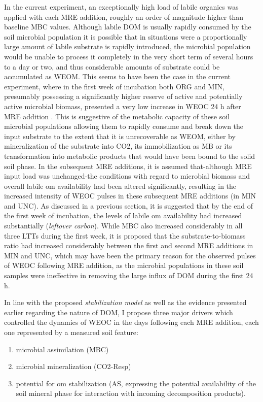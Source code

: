 	In the current experiment, an exceptionally high load of labile organics was applied with each MRE addition, roughly an order of magnitude higher than baseline MBC values.  Although labile DOM is usually rapidly consumed by the soil microbial population\myRed{*} it is possible that in situations were a proportionally large amount of labile substrate is rapidly introduced, the microbial population would be unable to process it completely\myRed{*} in the very short term of several hours to a day or two, and thus considerable amounts of substrate could be accumulated as WEOM. This seems to have been the case in the current experiment, where in the first week of incubation both ORG and MIN, presumably possessing a significantly higher reserve of active and potentially active microbial biomass, presented a very low increase in WEOC 24 h after MRE addition . This is suggestive of the metabolic capacity of these soil microbial populations allowing them to rapidly consume and break down the input substrate to the extent that it is unrecoverable as WEOM, either by mineralization of the substrate into CO2, its immobilization as MB or its transformation into metabolic products that would have been bound to the solid soil phase.
	 In the subsequent MRE additions, it is assumed that-although MRE input load was unchanged-the conditions with regard to microbial biomass and overall labile \gls{om} availability had been altered significantly, resulting in the increased intensity of WEOC pulses in these subsequent MRE additions (in MIN and UNC). As discussed in a previous section, it is suggested that by the end of the first week of incubation, the levels of labile \gls{om} availability had increased substantially (\textit{leftover carbon}). While MBC also increased  considerably in all three LTTs during the first week, it is proposed that the substrate-to-biomass  ratio had increased considerably between the first and second MRE additions in MIN and UNC, which may have been the primary reason for the observed pulses of WEOC following MRE addition, as the microbial populations in these soil samples were ineffective in removing the large influx of DOM during the first 24 h.

	In line with the proposed \textit{stabilization model} as well as the evidence presented earlier regarding the nature of DOM, I propose three  major drivers which controlled the dynamics of WEOC in the days following each MRE addition, each one represented by a measured soil feature:
	\begin{enumerate}
		\item microbial assimilation (MBC)
		\item microbial mineralization (CO2-Resp)
		\item potential for \gls{om} stabilization (AS, expressing the potential availability of the soil mineral phase for interaction with incoming decomposition products).
	\end{enumerate}


